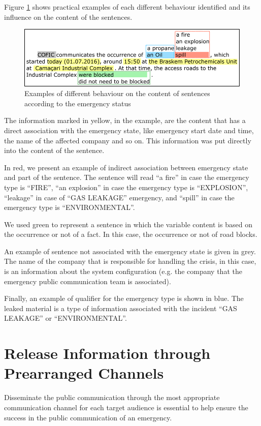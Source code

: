 Figure \ref{fig:sentenceContext} shows practical examples of each different behaviour identified and its influence on the content of the sentences.

\begin{figure}
\centering
\includegraphics[width=0.75\linewidth]{images/sentenceContext.png}
\caption{Examples of different behaviour on the content of sentences according to the emergency status}
\label{fig:sentenceContext}
\end{figure}

The information marked in yellow, in the example, are the content that has a direct association with the emergency state, like emergency start date and time, the name of the affected company and so on. This information was put directly into the content of the sentence.

In red, we present an example of indirect association between emergency state and part of the sentence. The sentence will read ``a fire'' in case the emergency type is ``FIRE'', ``an explosion'' in case the emergency type is ``EXPLOSION'', ``leakage'' in case of ``GAS LEAKAGE'' emergency, and ``spill'' in case the emergency type is ``ENVIRONMENTAL''. 

We used green to represent a sentence in which the variable content is based on the occurrence or not of a fact. In this case, the occurrence or not of road blocks. 

An example of sentence not associated with the emergency state is given in grey. The name of the company that is responsible for handling the crisis, in this case, is an information about the system configuration (e.g. the company that the emergency public communication team is associated).

Finally, an example of qualifier for the emergency type is shown in blue. The leaked material is a type of information associated with the incident ``GAS LEAKAGE'' or ``ENVIRONMENTAL''.

\section{Release Information through Prearranged Channels}

Disseminate the public communication through the most appropriate communication channel for each target audience is essential to help ensure the success in the public communication of an emergency.

